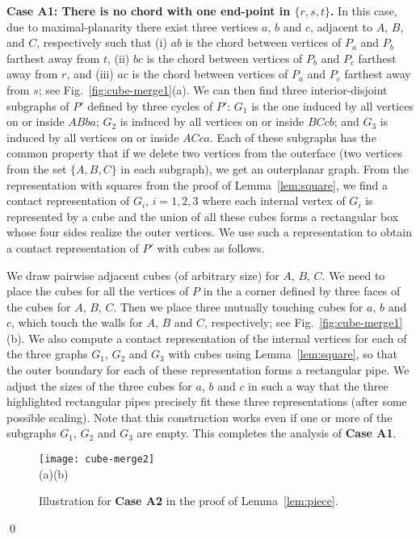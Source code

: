 \documentclass{llncs}
\renewenvironment{proof}{\medskip\noindent{\bf Proof:}}{\mbox{}\hfill\qed\par}
\begin{document}
\begin{proof}
\textbf{Case A1: There is no chord with one end-point in $\{r, s, t\}$.} In this case, due to
 maximal-planarity there exist three vertices $a$, $b$ and $c$, adjacent to $A$, $B$, and $C$,
 respectively such that (i) $ab$ is the chord between vertices of $P_a$ and $P_b$ farthest
 away from $t$, (ii) $bc$ is the chord between vertices of $P_b$ and $P_c$ farthest away
 from $r$, and (iii) $ac$ is the chord between vertices of $P_a$ and $P_c$ farthest away
 from $s$; see Fig.~\ref{fig:cube-merge1}(a). We can then find three interior-disjoint
 subgraphs of $P'$ defined by three
cycles of $P'$: $G_1$ is the one induced by
 all vertices on or inside $ABba$; $G_2$ is induced by all vertices on or inside $BCcb$;
 and $G_3$ is induced by all vertices on or inside $ACca$. Each of these subgraphs
 has the common property that if we delete two vertices from the outerface (two vertices from
 the set $\{A, B, C\}$ in each subgraph), we get an outerplanar graph.
From the representation with squares from the proof of Lemma~\ref{lem:square}, we find a contact
 representation of $G_i$, $i=1,2,3$ where each internal vertex of $G_i$ is represented by a cube
 and the union of all these cubes forms a rectangular box whose four sides realize the outer vertices.
 We use such a representation to obtain a contact representation of $P'$ with cubes as follows.





We draw pairwise adjacent cubes (of arbitrary size) for $A$, $B$,
$C$. We need to place the cubes for all the vertices of $P$ in the a
corner defined by three faces of the cubes for $A$, $B$, $C$. 
Then we place three mutually touching cubes for
 $a$, $b$ and $c$, which touch the walls for $A$, $B$ and $C$, respectively; see
 Fig.~\ref{fig:cube-merge1}(b). We also compute a contact representation of the internal
 vertices for each of the
 three graphs $G_1$, $G_2$ and $G_3$ with cubes using Lemma~\ref{lem:square}, so that
 the outer boundary for each of these representation forms a rectangular pipe. We adjust
 the sizes of the three cubes for $a$, $b$ and $c$ in such a way that the three highlighted
 rectangular pipes precisely fit these three representations (after some possible scaling).
 Note that this construction works even if one or more of the subgraphs $G_1$, $G_2$ and
 $G_3$ are empty. This completes the analysis of \textbf{Case A1}.




\begin{figure}[tb]
\centering
	\texttt{[image: cube-merge2]}\\
	(a)\hspace{0.38\textwidth}(b)\hspace{0.05\textwidth}
	\caption{Illustration for \textbf{Case A2} in the proof of Lemma~\ref{lem:piece}.}
	\label{fig:cube-merge2}
\end{figure}





\end{proof}
\end{document}
